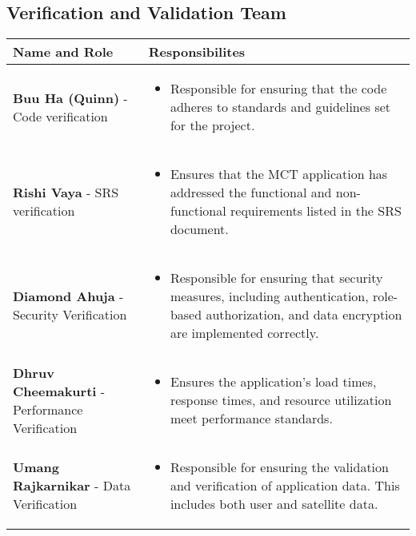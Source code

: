 \documentclass[12pt, titlepage]{article}
\begin{document}
\subsection{Verification and Validation Team}
\setlength{\arrayrulewidth}{0.5mm}
\setlength{\tabcolsep}{18pt}
\renewcommand{\arraystretch}{1.5}
\begin{tabular}{ | m{5cm} | m{8cm} | } 
\hline
  \textbf{Name and Role} & \textbf{Responsibilites} \\ 
  \hline
    \textbf{Buu Ha (Quinn)} - Code verification & \begin{itemize}
	\item Responsible for ensuring that the code adheres to standards and guidelines set for the project.
	
\end{itemize}\\ 
  \hline
   \textbf{Rishi Vaya} - SRS verification & \begin{itemize}
	\item Ensures that the MCT application has addressed the functional and non-functional requirements listed in the SRS document.
       
\end{itemize}\\ 
  \hline
    \textbf{Diamond Ahuja} - Security Verification & \begin{itemize}
	\item Responsible for ensuring that security measures, including authentication, role-based authorization, and data encryption are implemented correctly.
\end{itemize}\\ 
  \hline
   \textbf{Dhruv Cheemakurti} - Performance Verification & \begin{itemize}
	\item Ensures the application’s load times, response times, and resource utilization meet performance standards.
\end{itemize}\\ 
  \hline
    \textbf{Umang Rajkarnikar} - Data Verification & \begin{itemize}
	\item Responsible for ensuring the validation and verification of application data. This includes both user and satellite data.
\end{itemize}\\ 
  \hline

\end{tabular}
\end{document}
